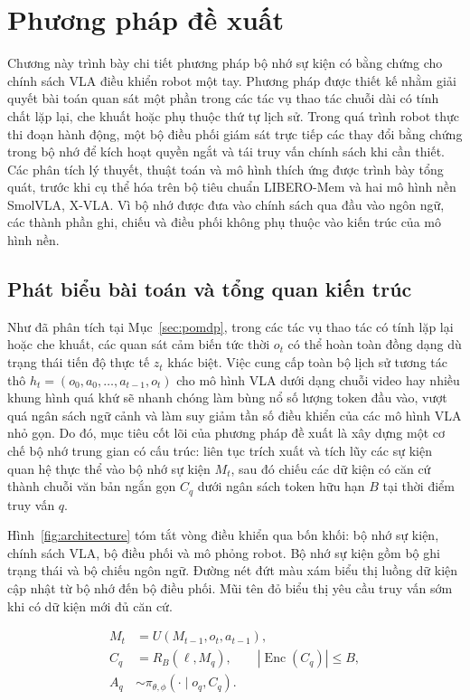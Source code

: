 \chapter{Phương pháp đề xuất}

Chương này trình bày chi tiết phương pháp bộ nhớ sự kiện có bằng chứng cho chính sách VLA điều khiển robot một tay. Phương pháp được thiết kế nhằm giải quyết bài toán quan sát một phần trong các tác vụ thao tác chuỗi dài có tính chất lặp lại, che khuất hoặc phụ thuộc thứ tự lịch sử. Trong quá trình robot thực thi đoạn hành động, một bộ điều phối giám sát trực tiếp các thay đổi bằng chứng trong bộ nhớ để kích hoạt quyền ngắt và tái truy vấn chính sách khi cần thiết. Các phân tích lý thuyết, thuật toán và mô hình thích ứng được trình bày tổng quát, trước khi cụ thể hóa trên bộ tiêu chuẩn LIBERO-Mem và hai mô hình nền SmolVLA, X-VLA. Vì bộ nhớ được đưa vào chính sách qua đầu vào ngôn ngữ, các thành phần ghi, chiếu và điều phối không phụ thuộc vào kiến trúc của mô hình nền.

\section{Phát biểu bài toán và tổng quan kiến trúc}

Như đã phân tích tại Mục~\ref{sec:pomdp}, trong các tác vụ thao tác có tính lặp lại hoặc che khuất, các quan sát cảm biến tức thời $o_t$ có thể hoàn toàn đồng dạng dù trạng thái tiến độ thực tế $z_t$ khác biệt. Việc cung cấp toàn bộ lịch sử tương tác thô $h_t = (o_0, a_0, \ldots, a_{t-1}, o_t)$ cho mô hình VLA dưới dạng chuỗi video hay nhiều khung hình quá khứ sẽ nhanh chóng làm bùng nổ số lượng token đầu vào, vượt quá ngân sách ngữ cảnh và làm suy giảm tần số điều khiển của các mô hình VLA nhỏ gọn. Do đó, mục tiêu cốt lõi của phương pháp đề xuất là xây dựng một cơ chế bộ nhớ trung gian có cấu trúc: liên tục trích xuất và tích lũy các sự kiện quan hệ thực thể vào bộ nhớ sự kiện $M_t$, sau đó chiếu các dữ kiện có căn cứ thành chuỗi văn bản ngắn gọn $C_q$ dưới ngân sách token hữu hạn $B$ tại thời điểm truy vấn $q$.

Hình~\ref{fig:architecture} tóm tắt vòng điều khiển qua bốn khối: bộ nhớ sự kiện, chính sách VLA, bộ điều phối và mô phỏng robot. Bộ nhớ sự kiện gồm bộ ghi trạng thái và bộ chiếu ngôn ngữ. Đường nét đứt màu xám biểu thị luồng dữ kiện cập nhật từ bộ nhớ đến bộ điều phối. Mũi tên đỏ biểu thị yêu cầu truy vấn sớm khi có dữ kiện mới đủ căn cứ.

\begin{equation}
\begin{aligned}
M_t &= U(M_{t-1}, o_t, a_{t-1}),\\
C_q &= R_B(\ell, M_q),\qquad |\operatorname{Enc}(C_q)| \le B,\\
A_q &\sim \pi_{\theta,\phi}(\cdot \mid o_q, C_q).
\end{aligned}
\label{eq:core-transforms}
\end{equation}

